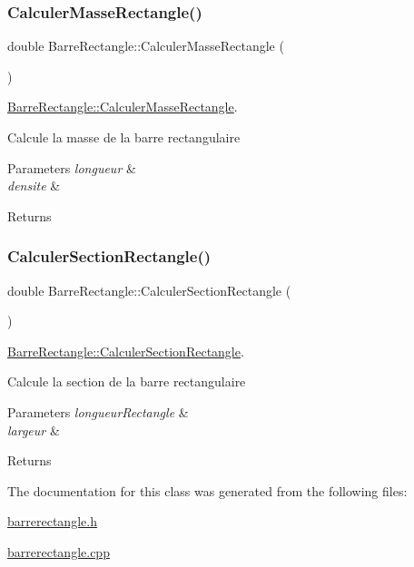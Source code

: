 \subsubsection{\texorpdfstring{Calculer\+Masse\+Rectangle()}{CalculerMasseRectangle()}}
{\footnotesize\ttfamily double Barre\+Rectangle\+::\+Calculer\+Masse\+Rectangle (\begin{DoxyParamCaption}{ }\end{DoxyParamCaption})}



\hyperlink{class_barre_rectangle_a7cff34b806c27adce7118384f06f71c7}{Barre\+Rectangle\+::\+Calculer\+Masse\+Rectangle}. 

Calcule la masse de la barre rectangulaire 
\begin{DoxyParams}{Parameters}
{\em longueur} & \\
\hline
{\em densite} & \\
\hline
\end{DoxyParams}
\begin{DoxyReturn}{Returns}

\end{DoxyReturn}
\mbox{\label{class_barre_rectangle_a73b3dffd34d10e478d5af2b2dd3c1a64}} 
\subsubsection{\texorpdfstring{Calculer\+Section\+Rectangle()}{CalculerSectionRectangle()}}
{\footnotesize\ttfamily double Barre\+Rectangle\+::\+Calculer\+Section\+Rectangle (\begin{DoxyParamCaption}{ }\end{DoxyParamCaption})}



\hyperlink{class_barre_rectangle_a73b3dffd34d10e478d5af2b2dd3c1a64}{Barre\+Rectangle\+::\+Calculer\+Section\+Rectangle}. 

Calcule la section de la barre rectangulaire 
\begin{DoxyParams}{Parameters}
{\em longueur\+Rectangle} & \\
\hline
{\em largeur} & \\
\hline
\end{DoxyParams}
\begin{DoxyReturn}{Returns}

\end{DoxyReturn}


The documentation for this class was generated from the following files\+:\begin{DoxyCompactItemize}
\item 
\hyperlink{barrerectangle_8h}{barrerectangle.\+h}\item 
\hyperlink{barrerectangle_8cpp}{barrerectangle.\+cpp}\end{DoxyCompactItemize}
